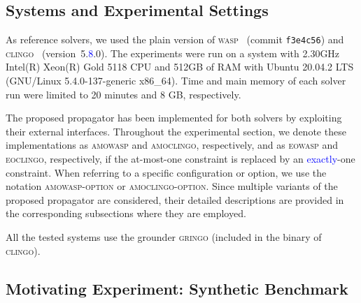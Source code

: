 \documentclass[preprint,authoryear]{elsarticle}
\theoremstyle{definition}
\begin{document}
\subsection{Systems and Experimental Settings}
As reference solvers, we used the plain version of \textsc{wasp}~\citep{DBLP:conf/lpnmr/AlvianoDLR15} (commit \texttt{f3e4c56}) and \textsc{clingo}~\citep{DBLP:conf/iclp/GebserKKOSW16} (version~5.\textcolor{blue}{8}.0).
The experiments were run on a system with 2.30GHz Intel(R) Xeon(R) Gold 5118 CPU and 512GB of RAM with Ubuntu 20.04.2 LTS (GNU/Linux 5.4.0-137-generic x86\_64).
Time and main memory of each solver run were limited to 20 minutes and 8 GB, respectively.

The proposed propagator has been implemented for both solvers by exploiting their external interfaces.  
Throughout the experimental section, we denote these implementations as \textsc{amowasp} and \textsc{amoclingo}, respectively, and as \textsc{eowasp} and \textsc{eoclingo}, respectively,  if the at-most-one constraint is replaced by an \textcolor{blue}{exactly}-one constraint.  
When referring to a specific configuration or option, we use the notation \textsc{amowasp-option} or \textsc{amoclingo-option}.  
Since multiple variants of the proposed propagator are considered, their detailed descriptions are provided in the corresponding subsections where they are employed.

All the tested systems use the grounder \textsc{gringo} (included in the binary of \textsc{clingo}).

\subsection{Motivating Experiment: Synthetic Benchmark}\label{sec:experiments:syntheticbenchmark}

			
\end{document}
